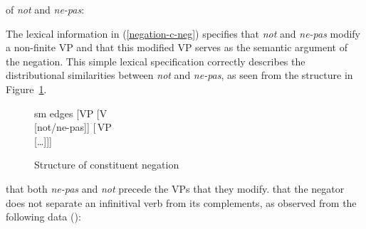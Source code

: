 \documentclass[output=paper
 	        ,biblatex
                ,babelshorthands
                ,newtxmath
                ,draftmode
                ,colorlinks, citecolor=brown
]{langscibook}
\begin{document}
\begin{exe}
\begin{xlist}
\begin{exe}
\begin{xlist}
\ea
\label{negation-c-neg}
\localvs of \emph{not} and \emph{ne-pas}:\\
\z

\noindent %
The lexical information in (\ref{negation-c-neg}) specifies that
\textit{not} and \textit{ne-pas} modify a non-finite VP and that this
modified VP serves as the semantic argument of the negation.
This simple lexical specification correctly describes the
distributional similarities between  \textit{not} and 
\textit{ne-pas}, as seen from the structure in Figure~\ref{negation-not-vp-mod}.

\begin{figure}
	\begin{forest}
		sm edges
		[VP
			[V\\
					[not/ne-pas]]
			[\,VP\\
					[\ldots]]]
	\end{forest}
\caption{Structure of constituent negation}\label{negation-not-vp-mod}
\end{figure}
\noindent
{} that
both \textit{ne-pas} and \textit{not} precede the VPs that they modify.
 that the negator does not separate an infinitival verb
from its complements, as observed from the following data (\citealp[]{KS:02}):


\end{xlist}
\end{exe}
\end{xlist}
\end{exe}
\end{document}
